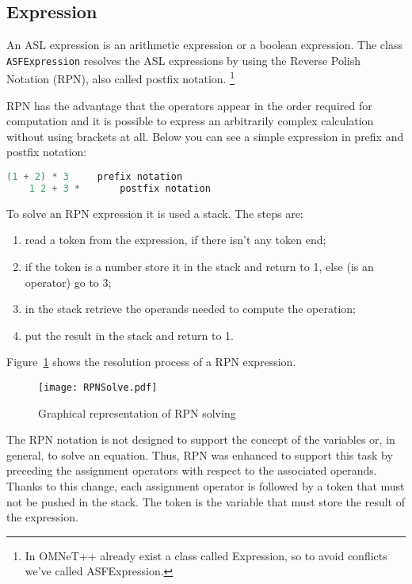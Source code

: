 \iffalse
It's necessary set the field sended to specify that this packet must be sent. Only modules, like \texttt{LocalFilter} and \texttt{GlobalFilter}, derivated by the class \texttt{cSimpleModule} can send messages and packets. The actions aren't derivated by the cSimpleModule.
\fi



\subsection{Expression}
An ASL expression is an arithmetic expression or a boolean expression. The class \texttt{ASFExpression} resolves the ASL expressions by using the Reverse Polish Notation (RPN), also called postfix notation. \footnote{In OMNeT++ already exist a class called Expression, so to avoid conflicts we've called ASFExpression.} 

RPN has the advantage that the operators appear in the order required for computation and it is possible to express an arbitrarily complex calculation without using brackets at all. Below you can see a simple expression in prefix and postfix notation:
%
\begin{lstlisting}[language={cpp}]
	(1 + 2) * 3		prefix notation
	1 2 + 3 *		postfix notation
\end{lstlisting}

To solve an RPN expression it is used a stack. The steps are:
%
\begin{enumerate}
\item read a token from the expression, if there isn't any token end;
\item if the token is a number store it in the stack and return to 1, else (is an operator) go to 3;
\item in the stack retrieve the operands needed to compute the operation;
\item put the result in the stack and return to 1.
\end{enumerate}
%
Figure~\ref{fig:RPNSolve} shows the resolution process of a RPN expression.
%
\begin{figure}
\centering
\texttt{[image: RPNSolve.pdf]}
\caption{Graphical representation of RPN solving}
\label{fig:RPNSolve}
\end{figure} 

The RPN notation is not designed to support the concept of the variables or, in general, to solve an equation. Thus, RPN was enhanced to support this task by preceding the assignment operators with respect to the associated operands. Thanks to this change, each assignment operator is followed by a token that must not be pushed in the stack. The token is the variable that must store the result of the expression.

